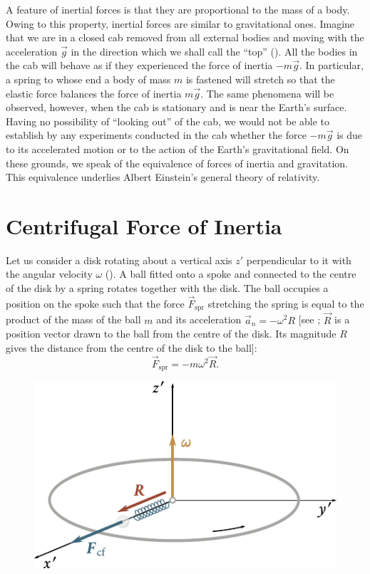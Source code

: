 A feature of inertial forces is that they are proportional to the mass of a body. Owing to this property, inertial forces are similar to gravitational ones. Imagine that we are in a closed cab removed from all external bodies and moving with the acceleration $\vec{g}$ in the direction which we shall call the ``top'' (). All the bodies in the cab will behave as if they experienced the force of inertia $-m\vec{g}$. In particular, a spring to whose end a body of mass $m$ is fastened will stretch so that the elastic force balances the force of inertia $m\vec{g}$. The same phenomena will be observed, however, when the cab is stationary and is near the Earth's surface. Having no possibility of ``looking out'' of the cab, we would not be able to establish by any experiments conducted in the cab whether the force $-m\vec{g}$ is due to its accelerated motion or to the action of the Earth's gravitational field. On these grounds, we speak of the equivalence of forces of inertia and gravitation. This equivalence underlies Albert Einstein's general theory of relativity.

\section{Centrifugal Force of Inertia}\label{sec:4_2}

Let us consider a disk rotating about a vertical axis $z'$ perpendicular to it with the angular velocity $\omega$ (). A ball fitted onto a spoke and connected to the centre of the disk by a spring rotates together with the disk. The ball occupies a position on the spoke such that the force $\vec{F}_{\text{spr}}$ stretching the spring is equal to the product of the mass of the ball $m$ and its acceleration $\vec{a}_n = -\omega^2R$ [see ; $\vec{R}$ is a position vector drawn to the ball from the centre of the disk. Its magnitude $R$ gives the distance from the centre of the disk to the ball]:
\begin{equation}\label{eq:4_4}
\vec{F}_{\text{spr}} = -m\omega^2\vec{R}.
\end{equation}

\begin{figure}[t]
	\begin{center}
		\includegraphics[scale=0.95]{figures/ch_04/fig_4_3.pdf}
		\caption[]{}
		\label{fig:4_3}
	\end{center}
\end{figure}

